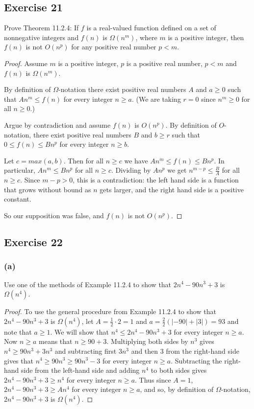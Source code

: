 \documentclass[14pt]{extarticle}
\newcommand{\dps}{\displaystyle}
\begin{document}
\subsection{Exercise 21}
Prove Theorem 11.2.4: If \(f\) is a real-valued function defined on a set of nonnegative integers and \(f(n)\) is
\(\Omega(n^m)\), where \(m\) is a positive integer, then \(f(n)\) is not \(O(n^p)\) for any positive real number
\(p < m\).

\begin{proof}
    Assume \(m\) is a positive integer, \(p\) is a positive real number, \(p < m\) and \(f(n)\) is \(\Omega(n^m)\).

    By definition of \(\Omega\)-notation there exist positive real numbers \(A\) and \(a \geq 0\) such that \(An^m \leq f(n)\)
    for every integer \(n \geq a\). (We are taking \(r = 0\) since \(n^m \geq 0\) for all \(n \geq 0\).)

    Argue by contradiction and assume \(f(n)\) is \(O(n^p)\). By definition of \(O\)-notation, there exist positive real
    numbers \(B\) and \(b \geq r\) such that \(0 \leq f(n) \leq Bn^p\) for every integer \(n \geq b\).

    Let \(c = max(a, b)\). Then for all \(n \geq c\) we have \(An^m \leq f(n) \leq Bn^p\). In particular, \(An^m \leq Bn^p\)
    for all \(n \geq c\). Dividing by \(An^p\) we get \(\dps n^{m-p} \leq \frac{B}{A}\) for all \(n \geq c\). Since \(m-p > 0\),
    this is a contradiction: the left hand side is a function that grows without bound as \(n\) gets larger, and the right hand
    side is a positive constant.

    So our supposition was false, and \(f(n)\) is not \(O(n^p)\).
\end{proof}

\subsection{Exercise 22}
\subsubsection{(a)}
Use one of the methods of Example 11.2.4 to show that \(2n^4 - 90n^3 + 3\) is \(\Omega(n^4)\).

\begin{proof}
    To use the general procedure from Example 11.2.4 to show that \(2n^4 - 90n^3 + 3\) is \(\Omega(n^4)\), let \(A = \frac{1}{2}
    \cdot 2 = 1\) and \(a = \frac{2}{2}(|-90| + |3|) = 93\) and note that \(a \geq 1\). We will show that \(n^4 \leq 2n^4 -
    90n^3 + 3\) for every integer \(n \geq a\). Now \(n \geq a\) means that \(n \geq 90+3\). Multiplying both sides by \(n^3\)
    gives \(n^4 \geq 90n^3 + 3n^3\) and subtracting first \(3n^3\) and then 3 from the right-hand side gives that \(n^4 \geq
    90n^3 \geq 90n^3 - 3\) for every integer \(n \geq a\). Subtracting the right-hand side from the left-hand side and
    adding \(n^4\) to both sides gives \(2n^4 - 90n^3 + 3 \geq n^4\) for every integer \(n \geq a\). Thus since \(A = 1\),
    \(2n^4 - 90n^3 + 3 \geq An^4\) for every integer \(n \geq a\), and so, by definition of \(\Omega\)-notation,
    \(2n^4 - 90n^3 + 3\) is \(\Omega(n^4)\).
\end{proof}
\end{document}
